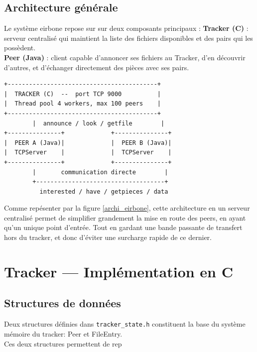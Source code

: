 \documentclass[11pt, a4paper]{article}
\begin{document}
\subsection{Architecture générale}
Le système eirbone repose sur sur deux composants principaux :
\textbf{Tracker (C)} : serveur centralisé qui maintient la liste des fichiers disponibles et des pairs qui les possèdent. \\
\textbf{Peer (Java)} : client capable d'annoncer ses fichiers au Tracker, d'en découvrir d'autres, et d'échanger directement des
          pièces avec ses pairs.
\begin{center}
\begin{tcolorbox}[colback=lightgray, colframe=bordergray, width=0.88\textwidth]
\begin{lstlisting}[language={}]
+------------------------------------------+
|  TRACKER (C)  --  port TCP 9000          |
|  Thread pool 4 workers, max 100 peers    |
+------------------------------------------+
        |  announce / look / getfile        |
+---------------+             +---------------+
|  PEER A (Java)|             |  PEER B (Java)|
|  TCPServer    |             |  TCPServer    |
+---------------+             +---------------+
        |       communication directe        |
        +------------------------------------+
          interested / have / getpieces / data
\end{lstlisting}
\caption{Architecture du système eirbone}
\label{archi_eirbone}
\end{tcolorbox}
\end{center}

Comme repésenter par la figure \ref{archi_eirbone}, cette architecture en un serveur centralisé permet de simplifier grandement la mise en route
des peers, en ayant qu'un unique point d'entrée. Tout en gardant une bande passante de transfert 
hors du tracker, et donc d'éviter une surcharge rapide de ce dernier.

\section{Tracker --- Implémentation en C}

\subsection{Structures de données}

Deux structures définies dans \texttt{tracker\_state.h} constituent la base du système mémoire du tracker:
Peer et FileEntry.\\
Ces deux structures permettent de rep
\end{document}
